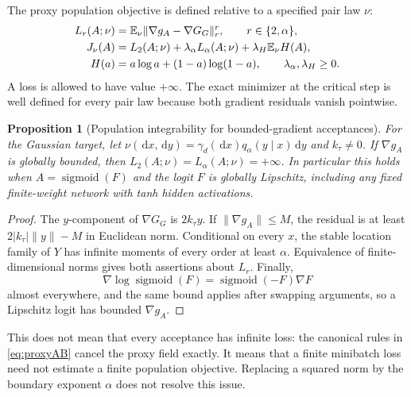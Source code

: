 \documentclass[pdflatex,iicol,sn-mathphys-ay]{sn-jnl}
\newtheorem{proposition}[theorem]{Proposition}
\theoremstyle{definition}\newtheorem{definition}[theorem]{Definition}
\theoremstyle{remark}\newtheorem{remark}[theorem]{Remark}
\numberwithin{equation}{section}
\newcommand{\dd}{\,\mathrm d}\newcommand{\cA}{c_\alpha}\newcommand{\sg}{\operatorname{sigmoid}}
\newcommand{\1}{\mathbf 1}
\begin{document}
The proxy population objective is defined relative to a specified pair law $\nu$:
\begin{align}
L_r(A;\nu)&=\mathbb E_\nu\|\nabla g_A-\nabla G_G\|_r^r,\qquad r\in\{2,\alpha\},\\
J_\nu(A)&=L_2(A;\nu)+\lambda_\alpha L_\alpha(A;\nu)
 +\lambda_H\mathbb E_\nu H(A),\label{eq:objective}\\
H(a)&=a\log a+(1-a)\log(1-a),\qquad \lambda_\alpha,\lambda_H\ge0.
\end{align}
A loss is allowed to have value $+\infty$. The exact minimizer at the critical step is well defined for every pair law because both gradient residuals vanish pointwise.

\begin{proposition}[Population integrability for bounded-gradient acceptances]\label{prop:integrability}
For the Gaussian target, let $\nu(\dd x,\dd y)=\gamma_d(\dd x)q_\alpha(y\mid x)\dd y$ and $k_\tau\ne0$. If $\nabla g_A$ is globally bounded, then $L_2(A;\nu)=L_\alpha(A;\nu)=+\infty$. In particular this holds when $A=\sg(F)$ and the logit $F$ is globally Lipschitz, including any fixed finite-weight network with tanh hidden activations.
\end{proposition}
\begin{proof}
The $y$-component of $\nabla G_G$ is $2k_\tau y$. If $\|\nabla g_A\|\le M$, the residual is at least $2|k_\tau|\|y\|-M$ in Euclidean norm. Conditional on every $x$, the stable location family of $Y$ has infinite moments of every order at least $\alpha$. Equivalence of finite-dimensional norms gives both assertions about $L_r$. Finally,
\[
\nabla\log\sg(F)=\sg(-F)\nabla F
\]
almost everywhere, and the same bound applies after swapping arguments, so a Lipschitz logit has bounded $\nabla g_A$.
\end{proof}
This does not mean that every acceptance has infinite loss: the canonical rules in \eqref{eq:proxyAB} cancel the proxy field exactly. It means that a finite minibatch loss need not estimate a finite population objective. Replacing a squared norm by the boundary exponent $\alpha$ does not resolve this issue.
\end{document}
